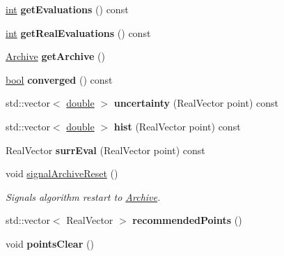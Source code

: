 \begin{DoxyCompactItemize}
\item 
\hyperlink{classint}{int} {\bfseries get\+Evaluations} () const\hypertarget{classUncertainFunc_a1c22d63650a493bed1de282ffda1fd69}{}\label{classUncertainFunc_a1c22d63650a493bed1de282ffda1fd69}

\item 
\hyperlink{classint}{int} {\bfseries get\+Real\+Evaluations} () const\hypertarget{classUncertainFunc_ae013bfe78f3585678e83f5587d63d427}{}\label{classUncertainFunc_ae013bfe78f3585678e83f5587d63d427}

\item 
\hyperlink{classArchive}{Archive} {\bfseries get\+Archive} ()\hypertarget{classUncertainFunc_a3fb8310f6ad93e6b333829f74023d13f}{}\label{classUncertainFunc_a3fb8310f6ad93e6b333829f74023d13f}

\item 
\hyperlink{classbool}{bool} {\bfseries converged} () const\hypertarget{classUncertainFunc_ad1ed4e1bbd3cd2b8b03c96c157cb9774}{}\label{classUncertainFunc_ad1ed4e1bbd3cd2b8b03c96c157cb9774}

\item 
std\+::vector$<$ \hyperlink{classdouble}{double} $>$ {\bfseries uncertainty} (Real\+Vector point) const\hypertarget{classUncertainFunc_a73a39a0c557b40e0e64218666f06ed9e}{}\label{classUncertainFunc_a73a39a0c557b40e0e64218666f06ed9e}

\item 
std\+::vector$<$ \hyperlink{classdouble}{double} $>$ {\bfseries hist} (Real\+Vector point) const\hypertarget{classUncertainFunc_aa5969910ed2ef6d058755b761384c491}{}\label{classUncertainFunc_aa5969910ed2ef6d058755b761384c491}

\item 
Real\+Vector {\bfseries surr\+Eval} (Real\+Vector point) const\hypertarget{classUncertainFunc_a6f0f1870a4338383fe717999954fe784}{}\label{classUncertainFunc_a6f0f1870a4338383fe717999954fe784}

\item 
void \hyperlink{classUncertainFunc_a8cb7fbb0a874eea4b218b6c60b44c827}{signal\+Archive\+Reset} ()\hypertarget{classUncertainFunc_a8cb7fbb0a874eea4b218b6c60b44c827}{}\label{classUncertainFunc_a8cb7fbb0a874eea4b218b6c60b44c827}

\begin{DoxyCompactList}\small\item\em Signals algorithm restart to \hyperlink{classArchive}{Archive}. \end{DoxyCompactList}\item 
std\+::vector$<$ Real\+Vector $>$ {\bfseries recommended\+Points} ()\hypertarget{classUncertainFunc_a92e7c213873cd8a62a52e2dcc2befbd7}{}\label{classUncertainFunc_a92e7c213873cd8a62a52e2dcc2befbd7}

\item 
void {\bfseries points\+Clear} ()\hypertarget{classUncertainFunc_ae882f501f1dc97ebfb0e31f8bce9e463}{}\label{classUncertainFunc_ae882f501f1dc97ebfb0e31f8bce9e463}

\end{DoxyCompactItemize}
